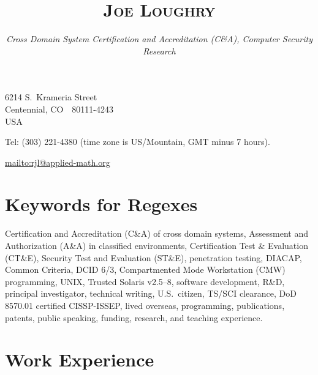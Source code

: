 \documentclass[letterpaper]{article}
\date{}
\title{\textsc{Joe Loughry}\vspace{-3mm}}
\author{\hspace{-4mm}\vspace{-5mm}\emph{Cross Domain System Certification and Accreditation (C\&A),
	Computer Security Research}
}
\begin{document}
\maketitle

\vspace*{-1.25cm}
\hfill 6214 S.\ Krameria Street \\
\hfill Centennial, CO\ \ 80111-4243 \\
\hfill USA 

Tel: (303) 221-4380 (time zone is US/Mountain, GMT minus 7 hours).

\url{mailto:rjl@applied-math.org}

\section*{Keywords for Regexes}

Certification and Accreditation (C\&A) of cross domain systems,
Assessment and Authorization (A\&A) in classified environments,
Certification Test \& Evaluation (CT\&E),
Security Test and Evaluation (ST\&E),
penetration testing,
DIACAP,
Common Criteria,
DCID 6/3,
Compartmented Mode Workstation (CMW) programming,
UNIX,
Trusted Solaris v2.5--8,
software development,
R\&D,
principal investigator,
technical writing,
U.S.\ citizen,
TS/SCI clearance,
DoD 8570.01 certified CISSP-ISSEP,
lived overseas,
programming,
publications,
patents,
public speaking,
funding,
research,
and teaching experience.

\section*{Work Experience} %
\end{document}
